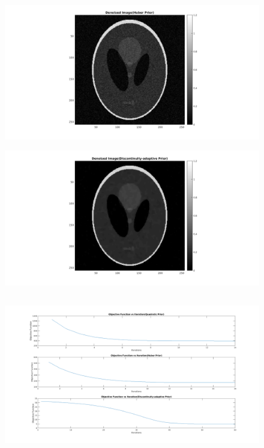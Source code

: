 \documentclass[11pt]{article}
\begin{document}
\begin{figure}[h]
\centering
\includegraphics[scale=0.5]{DenoisedHuber}
\end{figure}

\begin{figure}[h]
\includegraphics[scale=0.5]{DenoisedDA}
\centering
\end{figure}
\FloatBarrier

\subsection{}
\begin{figure}[h]
\hspace*{-1.5in}
\includegraphics[scale=0.48]{graphs}
\centering
\end{figure}
\FloatBarrier
\end{document}
